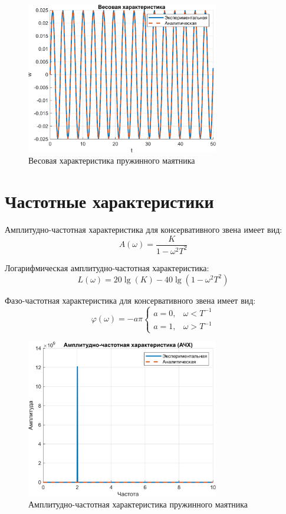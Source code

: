 \begin{figure}[H]
    \centering
    \includegraphics[width=0.75\textwidth, trim={0cm 0cm 0cm 0cm}]{../images/4_2.png}
    \caption{Весовая характеристика пружинного маятника}
\end{figure}

\section{Частотные характеристики}

Амплитудно-частотная характеристика для консервативного звена имеет вид:
\[
    A(\omega) = \frac{K}{1 - \omega^2 T^2}
\]

Логарифмическая амплитудно-частотная характеристика:
\[
    L(\omega) = 20 \lg(K) - 40 \lg(1 - \omega^2 T^2)
\]

Фазо-частотная характеристика для консервативного звена имеет вид:
\[
\varphi(\omega) = -a\pi 
\begin{cases} 
a = 0, & \omega < T^{-1} \\ 
a = 1, & \omega > T^{-1} 
\end{cases}
\]

\begin{figure}[H]
    \centering
    \includegraphics[width=0.75\textwidth, trim={0cm 0cm 0cm 0cm}]{../images/4_3.png}
    \caption{Амплитудно-частотная характеристика пружинного маятника}
\end{figure}

